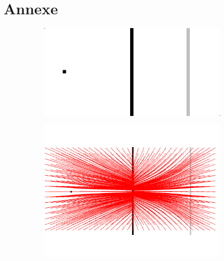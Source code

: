 \section{Annexe}

\begin{figure}[!h]
   \begin{subfigure}[c]{.5\linewidth}
     \centering
     \includegraphics[scale=0.35]{Chapters/Images/synthetic_map.png}
     \caption{}
   \end{subfigure} 
   \begin{subfigure}[c]{.5\linewidth}
     \centering
     \includegraphics[scale=0.35]{Chapters/Images/m1_gamma_5.png}
     \caption{}
   \end{subfigure} \\
   

\end{figure}
